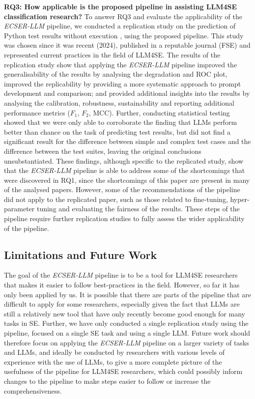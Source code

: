 \documentclass[a4paper]{article}
\newcommand{\newecser}{\textit{ECSER-LLM} }
\begin{document}
\textbf{RQ3: How applicable is the proposed pipeline in assisting LLM4SE classification research?}
To answer RQ3 and evaluate the applicability of the \newecser pipeline, we conducted a replication study on the prediction of Python test results without execution \cite{10.1145/3663529.3663794}, using the proposed pipeline. This study was chosen since it was recent (2024), published in a reputable journal (FSE) and represented current practices in the field of LLM4SE. The results of the replication study show that applying the \newecser pipeline improved the generalisability of the results by analysing the degradation and ROC plot, improved the replicability by providing a more systematic approach to prompt development and comparison; and provided additional insights into the results by analysing the calibration, robustness, sustainability and reporting additional performance metrics ($F_1$, $F_2$, MCC). Further, conducting statistical testing showed that we were only able to corroborate the finding that LLMs perform better than chance on the task of predicting test results, but did not find a significant result for the difference between simple and complex test cases and the difference between the test suites, leaving the original conclusions unsubstantiated. These findings, although specific to the replicated study, show that the \newecser pipeline is able to address some of the shortcomings that were discovered in RQ1, since the shortcomings of this paper are present in many of the analysed papers. However, some of the recommendations of the pipeline did not apply to the replicated paper, such as those related to fine-tuning, hyper-parameter tuning and evaluating the fairness of the results. These steps of the pipeline require further replication studies to fully assess the wider applicability of the pipeline.

\subsection{Limitations and Future Work}
The goal of the \newecser pipeline is to be a tool for LLM4SE researchers that makes it easier to follow best-practices in the field. However, so far it has only been applied by us. It is possible that there are parts of the pipeline that are difficult to apply for some researchers, especially given the fact that LLMs are still a relatively new tool that have only recently become good enough for many tasks in SE. Further, we have only conducted a single replication study using the pipeline, focused on a single SE task and using a single LLM. Future work should therefore focus on applying the \newecser pipeline on a larger variety of tasks and LLMs, and ideally be conducted by researchers with various levels of experience with the use of LLMs, to give a more complete picture of the usefulness of the pipeline for LLM4SE researchers, which could possibly inform changes to the pipeline to make steps easier to follow or increase the comprehensiveness. 
\end{document}
